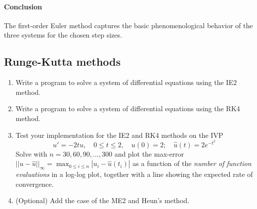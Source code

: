 \begin{solution}
	\paragraph{Conclusion}
	The first-order Euler method captures the basic phenomenological behavior of
	the three systems for the chosen step sizes.

\end{solution}

\subsection{Runge-Kutta methods}

\begin{exercise}
	\begin{enumerate}
		\item Write a program to solve a system of differential equations using
		      the IE2 method.
		\item Write a program to solve a system of differential equations using
		      the RK4 method.
		\item Test your implementation for the IE2 and RK4 methods on the IVP
		      \[
			      u' = -2t u, \quad 0 \le t \le 2, \quad u(0) = 2; \quad \hat{u}(t) = 2e^{-t^2}
		      \]
		      Solve with $n=30,60,90,\ldots,300$ and plot the max-error
		      $||u-\hat{u}||_\infty=\max_{0\leq i\leq n} |u_i-\hat{u}(t_i)|$ as a function of
		      the \emph{number of function evaluations} in a log-log plot, together with a
		      line showing the expected rate of convergence.
		\item (Optional) Add the case of the ME2 and Heun's method.
	\end{enumerate}
\end{exercise}

